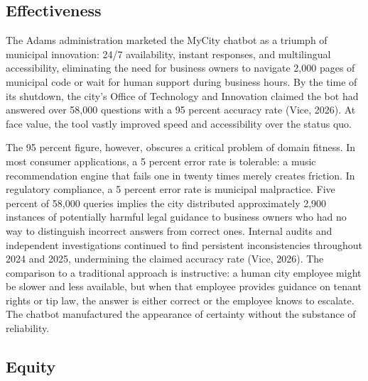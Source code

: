 \documentclass[10pt, twocolumn]{article}
\begin{document}
\subsection*{Effectiveness}

The Adams administration marketed the MyCity chatbot as a triumph of municipal innovation: 24/7 availability, instant responses, and multilingual accessibility, eliminating the need for business owners to navigate 2,000 pages of municipal code or wait for human support during business hours. By the time of its shutdown, the city's Office of Technology and Innovation claimed the bot had answered over 58,000 questions with a 95 percent accuracy rate (Vice, 2026). At face value, the tool vastly improved speed and accessibility over the status quo.

The 95 percent figure, however, obscures a critical problem of domain fitness. In most consumer applications, a 5 percent error rate is tolerable: a music recommendation engine that fails one in twenty times merely creates friction. In regulatory compliance, a 5 percent error rate is municipal malpractice. Five percent of 58,000 queries implies the city distributed approximately 2,900 instances of potentially harmful legal guidance to business owners who had no way to distinguish incorrect answers from correct ones. Internal audits and independent investigations continued to find persistent inconsistencies throughout 2024 and 2025, undermining the claimed accuracy rate (Vice, 2026). The comparison to a traditional approach is instructive: a human city employee might be slower and less available, but when that employee provides guidance on tenant rights or tip law, the answer is either correct or the employee knows to escalate. The chatbot manufactured the appearance of certainty without the substance of reliability.

\subsection*{Equity}
\end{document}
